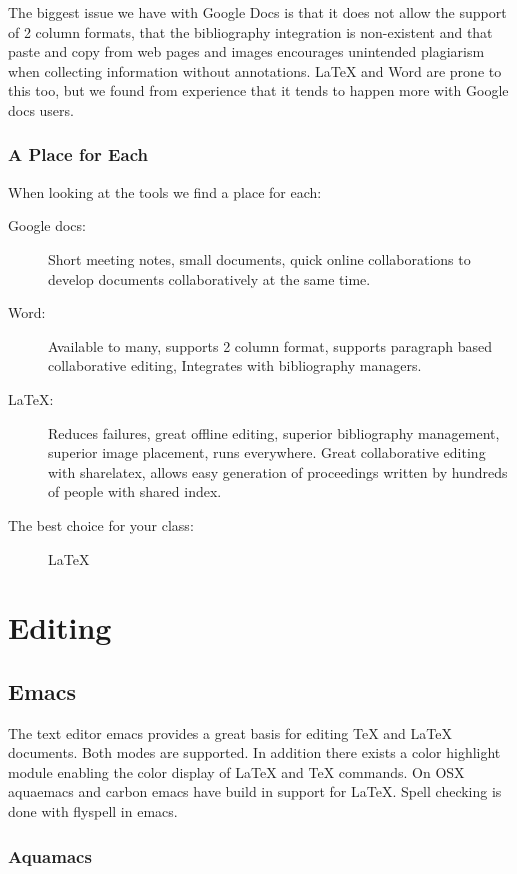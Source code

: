 The biggest issue we have with Google Docs is that it does not allow the
support of 2 column formats, that the bibliography integration is
non-existent and that paste and copy from web pages and images
encourages unintended plagiarism when collecting information without
annotations. LaTeX and Word are prone to this too, but we found from
experience that it tends to happen more with Google docs users.

\subsubsection{A Place for Each}\label{a-place-for-each}

When looking at the tools we find a place for each:

\begin{description}
\item[Google docs:]
Short meeting notes, small documents, quick online collaborations to
develop documents collaboratively at the same time.
\item[Word:]
Available to many, supports 2 column format, supports paragraph based
collaborative editing, Integrates with bibliography managers.
\item[LaTeX:]
Reduces failures, great offline editing, superior bibliography
management, superior image placement, runs everywhere. Great
collaborative editing with sharelatex, allows easy generation of
proceedings written by hundreds of people with shared index.
\item[The best choice for your class:]
LaTeX
\end{description}

\section{Editing}\label{editing}

\subsection{Emacs}\label{emacs}

The text editor emacs provides a great basis for editing TeX and LaTeX
documents. Both modes are supported. In addition there exists a color
highlight module enabling the color display of LaTeX and TeX commands.
On OSX aquaemacs and carbon emacs have build in support for LaTeX. Spell
checking is done with flyspell in emacs.

\subsubsection{Aquamacs}

